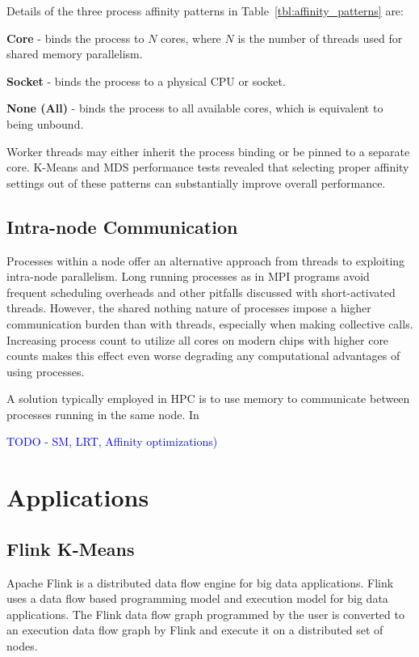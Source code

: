 \documentclass[10pt, conference, compsocconf]{IEEEtran}
\begin{document}
Details of the three process affinity patterns in Table~\ref{tbl:affinity_patterns} are:

\noindent\textbf{Core} - binds the process to $N$ cores, where $N$ is the number of threads used for shared memory parallelism.

\noindent\textbf{Socket} - binds the process to a physical \ac{CPU} or socket.

\noindent\textbf{None (All)} - binds the process to all available cores, which is equivalent to being unbound.

Worker threads may either inherit the process binding or be pinned to a separate core. K-Means and \ac{MDS} performance tests revealed that selecting proper affinity settings out of these patterns can substantially improve overall performance. 

\subsection{Intra-node Communication}
Processes within a node offer an alternative approach from threads to exploiting intra-node parallelism. Long running processes as in \ac{MPI} programs avoid frequent scheduling overheads and other pitfalls discussed with short-activated threads. However, the shared nothing nature of processes impose a higher communication burden than with threads, especially when making collective calls. Increasing process count to utilize all cores on modern chips with higher core counts makes this effect even worse degrading any computational advantages of using processes. 

A solution typically employed in \ac{HPC} is to use memory to communicate between processes running in the same node. In~\cite{}

\textcolor{blue}{TODO - SM, LRT, Affinity optimizations)}

\section{Applications} \label{sec:applications}
\subsection{Flink K-Means}
Apache Flink is a distributed data flow engine for big data applications. Flink uses a data flow based programming model and execution model for big data applications. The Flink data flow graph programmed by the user is converted to an execution data flow graph by Flink and execute it on a distributed set of nodes.
\end{document}
